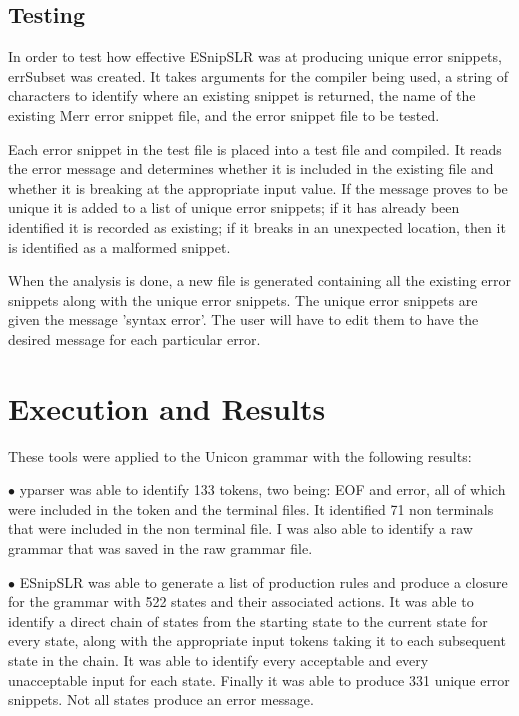 \documentclass{article}
\begin{document}
{\subsection{Testing}
In order to test how effective ESnipSLR was at producing unique error snippets, errSubset was created.  It takes arguments for the compiler being used, a string of characters to identify where an existing snippet is returned, the name of the existing Merr error snippet file, and the error snippet file to be tested. 

Each error snippet in the test file is placed into a test file and compiled.  It reads the error message and determines whether it is included in the existing file and whether it is breaking at the appropriate input value.  If the message proves to be unique it is added to a list of unique error snippets; if it has already been identified it is recorded as existing; if it breaks in an unexpected location, then it is identified as a malformed snippet.

When the analysis is done, a new file is generated containing all the existing error snippets along with the unique error snippets.  The unique error snippets are given the message 'syntax error'.  The user will have to edit them to have the desired message for each particular error.

\section{Execution and Results}
These tools were applied to the Unicon grammar with the following results:

$\bullet$ yparser was able to identify 133 tokens, two being: EOF and error, all of which were included in the token and the terminal files.  It identified 71 non terminals that were included in the non terminal file.  I was also able to identify a raw grammar that was saved in the raw grammar file.

$\bullet$ ESnipSLR was able to generate a list of production rules and produce a closure for the grammar with 522 states and their associated actions.  It was able to identify a direct chain of states from the starting state to the current state for every state, along with the appropriate input tokens taking it to each subsequent state in the chain.  It was able to identify every acceptable and every unacceptable input for each state.  Finally it was able to produce 331 unique error snippets.  Not all states produce an error message. ~\cite{jeffery}

}
\end{document}
